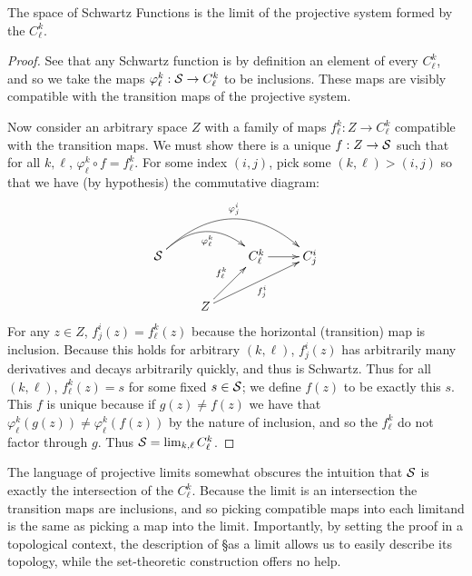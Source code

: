       \begin{thm}
        The space of Schwartz Functions is the limit of the projective system formed by the $C^k_\ell$.
      \end{thm}
      \begin{proof}
        See that any Schwartz function is by definition an element of every $C^k_\ell$, and so we take the maps $\varphi^k_\ell:\S\rightarrow C^k_\ell$ to be inclusions.
        These maps are visibly compatible with the transition maps of the projective system.

        Now consider an arbitrary space $Z$ with a family of maps $f^k_\ell:Z\rightarrow C^k_\ell$ compatible with the transition maps.
        We must show there is a unique $f:Z\rightarrow\S$ such that for all $k,\ell$, $\varphi^k_\ell\circ f = f^k_\ell$.
        For some index $(i,j)$, pick some $(k,\ell)>(i,j)$ so that we have (by hypothesis) the commutative diagram:
        \begin{displaymath}
          \xymatrix{
            \S \ar@/^20pt/[rr]_{\varphi^k_\ell} \ar@/^30pt/[rrr]^{\varphi^i_j} && C^k_\ell \ar[r] & C^i_j \\
            & Z \ar[ur]^{f^k_\ell} \ar[urr]_{f^i_j}
          }
        \end{displaymath}
        For any $z\in Z$, $f^i_j(z)=f^k_\ell(z)$ because the horizontal (transition) map is inclusion.
        Because this holds for arbitrary $(k,\ell)$, $f^i_j(z)$ has arbitrarily many derivatives and decays arbitrarily quickly, and thus is Schwartz.
        Thus for all $(k,\ell)$, $f^k_\ell(z)=s$ for some fixed $s\in\S$; we define $f(z)$ to be exactly this $s$.
        This $f$ is unique because if $g(z)\ne f(z)$ we have that $\varphi^k_\ell(g(z))\ne\varphi^k_\ell(f(z))$ by the nature of inclusion, and so the $f^k_\ell$ do not factor through $g$.
        Thus $\S=\lim_{k,\ell}C^k_\ell$.
      \end{proof}
      \begin{rmk}
        The language of projective limits somewhat obscures the intuition that $\S$ is exactly the intersection of the $C^k_\ell$.
        Because the limit is an intersection the transition maps are inclusions, and so picking compatible maps into each limitand is the same as picking a map into the limit.
        Importantly, by setting the proof in a topological context, the description of \S as a limit allows us to easily describe its topology, while the set-theoretic construction offers no help.
      \end{rmk}
